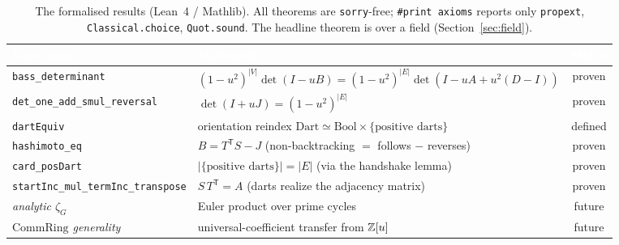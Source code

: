 
\begin{table}[t]
  \centering
  \small
  \caption{The formalised results (Lean~4 / Mathlib). All theorems are
  \texttt{sorry}-free; \texttt{\#print axioms} reports only \texttt{propext},
  \texttt{Classical.choice}, \texttt{Quot.sound}. The headline theorem is over a field
  (Section~\ref{sec:field}).}
  \label{tab:bass_results}
  \begin{tabular}{@{}llc@{}}
    \toprule
    \rowcolor{ggteal}
    \textcolor{white}{\textbf{Lean name}} & \textcolor{white}{\textbf{Statement}} & \textcolor{white}{\textbf{Status}} \\
    \midrule
    \rowcolor{ggband}
    \texttt{bass\_determinant} & $(1{-}u^2)^{|V|}\det(I{-}uB)=(1{-}u^2)^{|E|}\det(I{-}uA{+}u^2(D{-}I))$ & proven \\
    \texttt{det\_one\_add\_smul\_reversal} & $\det(I+uJ)=(1-u^2)^{|E|}$ & proven \\
    \rowcolor{ggband}
    \texttt{dartEquiv} & orientation reindex $\mathrm{Dart}\simeq\mathrm{Bool}\times\{\text{positive darts}\}$ & defined \\
    \texttt{hashimoto\_eq} & $B=T^{\mathsf T}S-J$ (non-backtracking $=$ follows $-$ reverses) & proven \\
    \rowcolor{ggband}
    \texttt{card\_posDart} & $|\{\text{positive darts}\}|=|E|$ (via the handshake lemma) & proven \\
    \texttt{startInc\_mul\_termInc\_transpose} & $S\,T^{\mathsf T}=A$ (darts realize the adjacency matrix) & proven \\
    \midrule
    \emph{analytic $\zeta_G$} & Euler product over prime cycles & future \\
    \rowcolor{ggband}
    \emph{$\mathrm{CommRing}$ generality} & universal-coefficient transfer from $\mathbb{Z}[u]$ & future \\
    \bottomrule
  \end{tabular}
\end{table}


